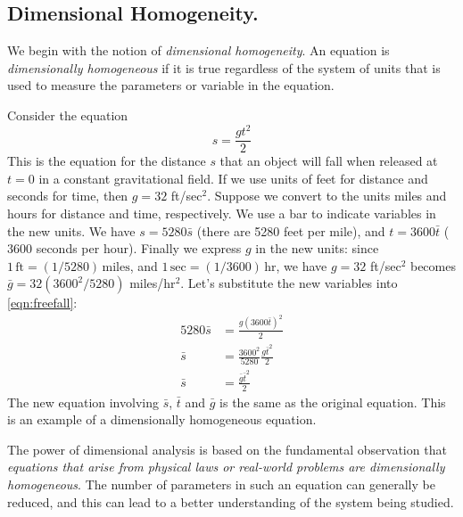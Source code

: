 \subsection{Dimensional Homogeneity.}
We begin with the notion of \emph{dimensional
homogeneity}.
An equation is \emph{dimensionally homogeneous}
if it is true regardless of the system
of units that is used to measure the parameters
or variable in the equation.
\begin{xexample}
Consider the equation
\begin{equation}
   s = \frac{gt^2}{2}
\label{eqn:freefall}
\end{equation}
This is the equation for the
distance $s$ that an object will fall when released
at $t=0$ in a constant gravitational field.
If we use units of feet for distance and seconds
for time, then $g=32$ ft/sec$^2$.
Suppose we convert to the units miles and hours
for distance and time, respectively.
We use a bar to indicate variables in the 
new units.  We have $s = 5280\bar{s}$ (there
are 5280 feet per mile), and $t = 3600\bar{t}$
($3600$ seconds per hour).
Finally we express $g$ in the new units:
since $1 \,\textrm{ft} = (1/5280) \,\textrm{miles}$, and
$1 \,\textrm{sec} = (1/3600) \,\textrm{hr}$, we have
$g = 32$ ft/sec$^2$ becomes $\bar{g} = 32 (3600^2/5280)$
miles/hr$^2$.
Let's substitute the new variables into
\eqref{eqn:freefall}:
\begin{equation}
\begin{split}
   5280\bar{s} & = \frac{g\left(3600\bar{t}\right)^2}{2} \\
   \bar{s} & = \frac{3600^2}{5280} \frac{g\bar{t}^2}{2} \\
   \bar{s} & = \frac{\bar{g}\bar{t}^2}{2}
\end{split}
\end{equation}
The new equation involving $\bar{s}$, $\bar{t}$ and $\bar{g}$
is the same as the original equation.
This is an example of a dimensionally homogeneous equation.
\end{xexample}

\medskip
The power of dimensional analysis is based on the
fundamental observation that
\emph{equations that arise from physical laws
or real-world problems are dimensionally homogeneous}.
The number of parameters in such an equation can generally
be reduced, and this can lead to a better understanding
of the system being studied.

